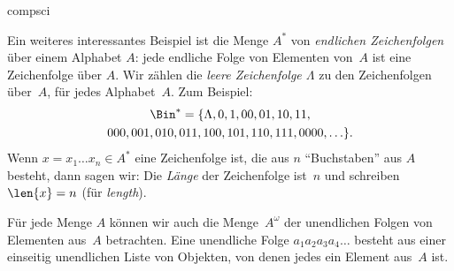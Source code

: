 \documentclass[../../../include/open-logic-section]{subfiles}
\begin{document}
\begin{tagblock}{compsci}
\begin{ex}[Strings] 
Ein weiteres interessantes Beispiel ist die Menge $A^{*}$ von \emph{endlichen Zeichenfolgen}
über einem Alphabet $A$: jede endliche Folge von Elementen von~$A$
ist eine Zeichenfolge über $A$. Wir zählen die \emph{leere Zeichenfolge $\Lambda$}
zu den Zeichenfolgen über~$A$, für jedes Alphabet~$A$. Zum Beispiel:
\begin{multline*}
\Bin^*
=\{\Lambda,0,1,00,01,10,11,\\
000,001,010,011,100,101,110,111,0000,\ldots\}.
\end{multline*}
Wenn $x=x_{1}\ldots x_{n}\in A^{*}$ eine Zeichenfolge ist, die aus $n$
``Buchstaben'' aus $A$ besteht, dann sagen wir: Die \emph{Länge} der Zeichenfolge ist~$n$
und schreiben $\len{x}=n$ (für \emph{length}).
\end{ex}
\end{tagblock}

\begin{ex}
Für jede Menge $A$ können wir auch die Menge~$A^\omega$ der unendlichen
Folgen von Elementen aus~$A$ betrachten. Eine unendliche Folge
$a_1a_2a_3a_4\dots$ besteht aus einer einseitig unendlichen Liste von Objekten,
von denen jedes ein Element aus~$A$ ist.
\end{ex}
\end{document}
